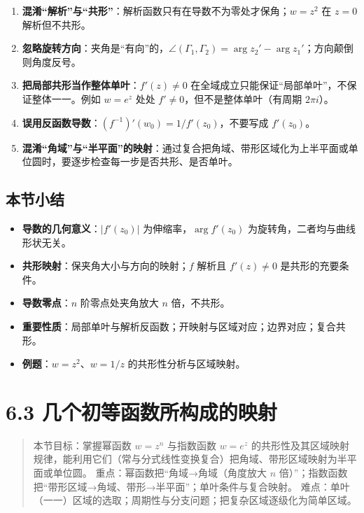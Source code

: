 \begin{enumerate}
\def\labelenumi{\arabic{enumi}.}
\tightlist
\item
  \textbf{混淆``解析''与``共形''}：解析函数只有在导数不为零处才保角；\(w=z^2\)
  在 \(z=0\) 解析但不共形。
\item
  \textbf{忽略旋转方向}：夹角是``有向''的，\(\angle(\Gamma_1,\Gamma_2)=\arg z_2'-\arg z_1'\)；方向颠倒则角度反号。
\item
  \textbf{把局部共形当作整体单叶}：\(f'(z)\neq 0\)
  在全域成立只能保证``局部单叶''，不保证整体一一。例如 \(w=e^z\) 处处
  \(f'\neq0\)，但不是整体单叶（有周期 \(2\pi i\)）。
\item
  \textbf{误用反函数导数}：\((f^{-1})'(w_0)=1/f'(z_0)\)，不要写成
  \(f'(z_0)\)。
\item
  \textbf{混淆``角域''与``半平面''的映射}：通过复合把角域、带形区域化为上半平面或单位圆时，要逐步检查每一步是否共形、是否单叶。
\end{enumerate}

\subsection{本节小结}\label{ux672cux8282ux5c0fux7ed3-19}

\begin{itemize}
\tightlist
\item
  \textbf{导数的几何意义}：\(|f'(z_0)|\) 为伸缩率，\(\arg f'(z_0)\)
  为旋转角，二者均与曲线形状无关。
\item
  \textbf{共形映射}：保夹角大小与方向的映射；\(f\) 解析且 \(f'(z)\neq0\)
  是共形的充要条件。
\item
  \textbf{导数零点}：\(n\) 阶零点处夹角放大 \(n\) 倍，不共形。
\item
  \textbf{重要性质}：局部单叶与解析反函数；开映射与区域对应；边界对应；复合共形。
\item
  \textbf{例题}：\(w=z^2\)、\(w=1/z\) 的共形性分析与区域映射。
\end{itemize}

\section{6.3
几个初等函数所构成的映射}\label{ux51e0ux4e2aux521dux7b49ux51fdux6570ux6240ux6784ux6210ux7684ux6620ux5c04}

\begin{quote}
本节目标：掌握幂函数 \(w=z^n\) 与指数函数 \(w=e^z\)
的共形性及其区域映射规律，能利用它们（常与分式线性变换复合）把角域、带形区域映射为半平面或单位圆。
重点：幂函数把``角域→角域（角度放大 \(n\)
倍）''；指数函数把``带形区域→角域、带形→半平面''；单叶条件与复合映射。
难点：单叶（一一）区域的选取；周期性与分支问题；把复杂区域逐级化为简单区域。
\end{quote}

